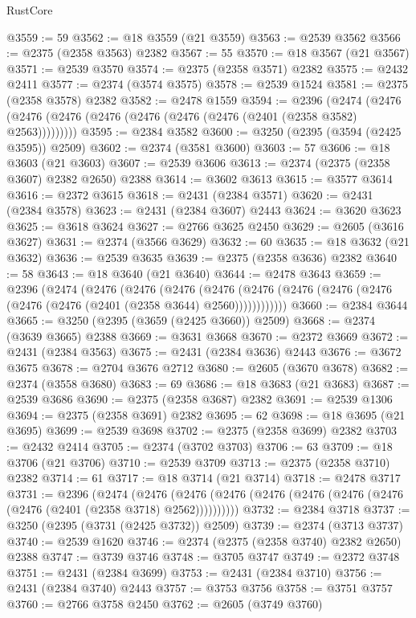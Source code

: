 \begin{lexlean}{RustCore}
\begin{coremodule}
@3559 := 59
@3562 := @18 @3559 (@21 @3559)
@3563 := @2539 @3562
@3566 := @2375 (@2358 @3563) @2382
@3567 := 55
@3570 := @18 @3567 (@21 @3567)
@3571 := @2539 @3570
@3574 := @2375 (@2358 @3571) @2382
@3575 := @2432 @2411
@3577 := @2374 (@3574 @3575)
@3578 := @2539 @1524
@3581 := @2375 (@2358 @3578) @2382
@3582 := @2478 @1559
@3594 := @2396
    (@2474 (@2476 (@2476 (@2476 (@2476 (@2476 (@2476 (@2476 (@2401 (@2358 @3582) @2563)))))))))
@3595 := @2384 @3582
@3600 := @3250 (@2395 (@3594 (@2425 @3595)) @2509)
@3602 := @2374 (@3581 @3600)
@3603 := 57
@3606 := @18 @3603 (@21 @3603)
@3607 := @2539 @3606
@3613 := @2374 (@2375 (@2358 @3607) @2382 @2650) @2388
@3614 := @3602 @3613
@3615 := @3577 @3614
@3616 := @2372 @3615
@3618 := @2431 (@2384 @3571)
@3620 := @2431 (@2384 @3578)
@3623 := @2431 (@2384 @3607) @2443
@3624 := @3620 @3623
@3625 := @3618 @3624
@3627 := @2766 @3625 @2450
@3629 := @2605 (@3616 @3627)
@3631 := @2374 (@3566 @3629)
@3632 := 60
@3635 := @18 @3632 (@21 @3632)
@3636 := @2539 @3635
@3639 := @2375 (@2358 @3636) @2382
@3640 := 58
@3643 := @18 @3640 (@21 @3640)
@3644 := @2478 @3643
@3659 := @2396
    (@2474
      (@2476
        (@2476
          (@2476
            (@2476 (@2476 (@2476 (@2476 (@2476 (@2476 (@2476 (@2401 (@2358 @3644) @2560))))))))))))
@3660 := @2384 @3644
@3665 := @3250 (@2395 (@3659 (@2425 @3660)) @2509)
@3668 := @2374 (@3639 @3665) @2388
@3669 := @3631 @3668
@3670 := @2372 @3669
@3672 := @2431 (@2384 @3563)
@3675 := @2431 (@2384 @3636) @2443
@3676 := @3672 @3675
@3678 := @2704 @3676 @2712
@3680 := @2605 (@3670 @3678)
@3682 := @2374 (@3558 @3680)
@3683 := 69
@3686 := @18 @3683 (@21 @3683)
@3687 := @2539 @3686
@3690 := @2375 (@2358 @3687) @2382
@3691 := @2539 @1306
@3694 := @2375 (@2358 @3691) @2382
@3695 := 62
@3698 := @18 @3695 (@21 @3695)
@3699 := @2539 @3698
@3702 := @2375 (@2358 @3699) @2382
@3703 := @2432 @2414
@3705 := @2374 (@3702 @3703)
@3706 := 63
@3709 := @18 @3706 (@21 @3706)
@3710 := @2539 @3709
@3713 := @2375 (@2358 @3710) @2382
@3714 := 61
@3717 := @18 @3714 (@21 @3714)
@3718 := @2478 @3717
@3731 := @2396
    (@2474
      (@2476 (@2476 (@2476 (@2476 (@2476 (@2476 (@2476 (@2476 (@2401 (@2358 @3718) @2562))))))))))
@3732 := @2384 @3718
@3737 := @3250 (@2395 (@3731 (@2425 @3732)) @2509)
@3739 := @2374 (@3713 @3737)
@3740 := @2539 @1620
@3746 := @2374 (@2375 (@2358 @3740) @2382 @2650) @2388
@3747 := @3739 @3746
@3748 := @3705 @3747
@3749 := @2372 @3748
@3751 := @2431 (@2384 @3699)
@3753 := @2431 (@2384 @3710)
@3756 := @2431 (@2384 @3740) @2443
@3757 := @3753 @3756
@3758 := @3751 @3757
@3760 := @2766 @3758 @2450
@3762 := @2605 (@3749 @3760)

\end{coremodule}
\end{lexlean}
